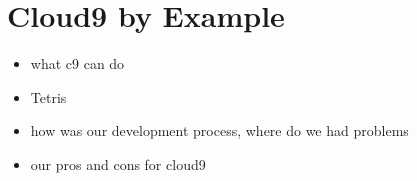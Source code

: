\section{Cloud9 by Example}
\label{sec:Motivation}

\begin{itemize}
	\item what c9 can do
	\item Tetris
	\item how was our development process, where do we had problems	
	\item our pros and cons for cloud9
\end{itemize}

